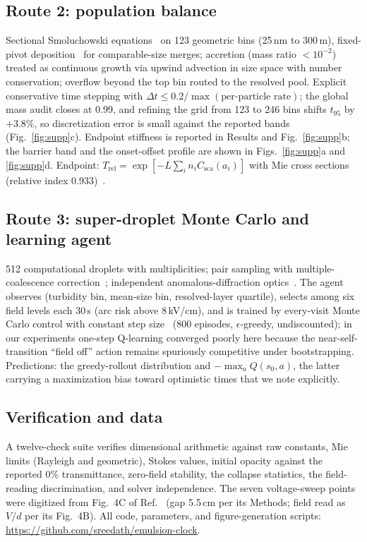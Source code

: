 \documentclass[aps,prfluids,reprint,amsmath,amssymb,superscriptaddress,longbibliography]{revtex4-2}
\begin{document}
\subsection{Route 2: population balance}
Sectional Smoluchowski equations~\cite{ramkrishna2000} on 123 geometric
bins (25\,nm to 300\,\textmu m),
fixed-pivot deposition~\cite{kumar1996} for comparable-size merges; accretion
(mass ratio $<10^{-2}$) treated as continuous growth via upwind advection in
size space with number conservation; overflow beyond the top bin routed to
the resolved pool. Explicit conservative time stepping with
$\Delta t\le0.2/\max(\text{per-particle rate})$; the global mass audit
closes at 0.99, and refining the grid from 123 to 246 bins shifts $t_{95}$
by $+3.8\%$, so discretization error is small against the reported bands
(Fig.~\ref{fig:supp}c). Endpoint stiffness is reported in Results and
Fig.~\ref{fig:supp}b; the barrier band and the onset-offset profile are
shown in Figs.~\ref{fig:supp}a and \ref{fig:supp}d.
Endpoint: $T_{\mathrm{rel}}=\exp[-L\sum_in_iC_{\mathrm{sca}}(a_i)]$ with
Mie cross sections (relative index 0.933)~\cite{bohren1983}.

\subsection{Route 3: super-droplet Monte Carlo and learning agent}
512 computational droplets with multiplicities; pair sampling with
multiple-coalescence correction~\cite{shima2009}; independent
anomalous-diffraction optics~\cite{vandehulst1957}. The agent observes
(turbidity bin, mean-size bin, resolved-layer quartile), selects among six
field levels each 30\,s (arc risk above 8\,kV/cm), and is trained by
every-visit Monte Carlo control with constant step
size~\cite{sutton2018} (800 episodes, $\epsilon$-greedy, undiscounted);
in our experiments one-step Q-learning converged poorly here because the
near-self-transition ``field off'' action remains spuriously competitive
under bootstrapping. Predictions: the greedy-rollout distribution and
$-\max_aQ(s_0,a)$, the latter carrying a maximization bias toward
optimistic times that we note explicitly.

\subsection{Verification and data}
A twelve-check suite verifies dimensional arithmetic against raw constants,
Mie limits (Rayleigh and geometric), Stokes values, initial opacity against
the reported 0\% transmittance, zero-field stability, the collapse
statistics, the field-reading discrimination, and solver independence. The
seven voltage-sweep points were digitized from Fig.~4C of
Ref.~\cite{panat2025} (gap 5.5\,cm per its Methods; field read as $V/d$ per
its Fig.~4B). All code, parameters, and figure-generation scripts:
\url{https://github.com/sreedath/emulsion-clock}.
\end{document}
